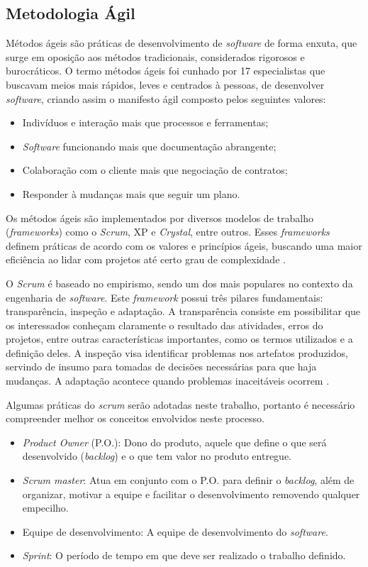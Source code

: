 \subsection{Metodologia Ágil}

Métodos ágeis são práticas de desenvolvimento de \textit{software} de forma enxuta, que surge em oposição aos métodos tradicionais, considerados rigorosos e burocráticos. O termo métodos ágeis foi cunhado por 17 especialistas que buscavam meios mais rápidos, leves e centrados à pessoas, de desenvolver \textit{software}, criando assim o manifesto ágil composto pelos seguintes valores:

\begin{itemize}
	\item Indivíduos e interação mais que processos e ferramentas;
	\item \textit{Software} funcionando mais que documentação abrangente;
	\item Colaboração com o cliente mais que negociação de contratos;
	\item Responder à mudanças mais que seguir um plano.
\end{itemize}

Os métodos ágeis são implementados por diversos modelos de trabalho (\textit{frameworks}) como o \textit{Scrum}, XP e \textit{Crystal}, entre outros. Esses \textit{frameworks} definem práticas de acordo com os valores e princípios ágeis, buscando uma maior eficiência ao lidar com projetos até certo grau de complexidade \cite{prik2014}.

O \textit{Scrum} é baseado no empirismo, sendo um dos mais populares no contexto da engenharia de \textit{software}. Este \textit{framework} possui três pilares fundamentais: transparência, inspeção e adaptação. A transparência consiste em possibilitar que os interessados conheçam claramente o resultado das atividades, erros do projetos, entre outras características importantes, como os termos utilizados e a definição deles. A inspeção visa identificar problemas nos artefatos produzidos, servindo de insumo para tomadas de decisões necessárias para que haja mudanças. A adaptação acontece quando problemas inaceitáveis ocorrem \cite{scrum2014}.

Algumas práticas do \textit{scrum} serão adotadas neste trabalho, portanto é necessário compreender melhor os conceitos envolvidos neste processo.

\begin{itemize}
	\item \textit{Product Owner} (P.O.): Dono do produto, aquele que define o que será desenvolvido (\textit{backlog}) e o que tem valor no produto entregue.
	\item \textit{Scrum master}: Atua em conjunto com o P.O. para definir o \textit{backlog}, além de organizar, motivar a equipe e facilitar o desenvolvimento removendo qualquer empecilho.
	\item Equipe de desenvolvimento: A equipe de desenvolvimento do \textit{software}.
	\item \textit{Sprint}: O período de tempo em que deve ser realizado o trabalho definido.
\end{itemize}

